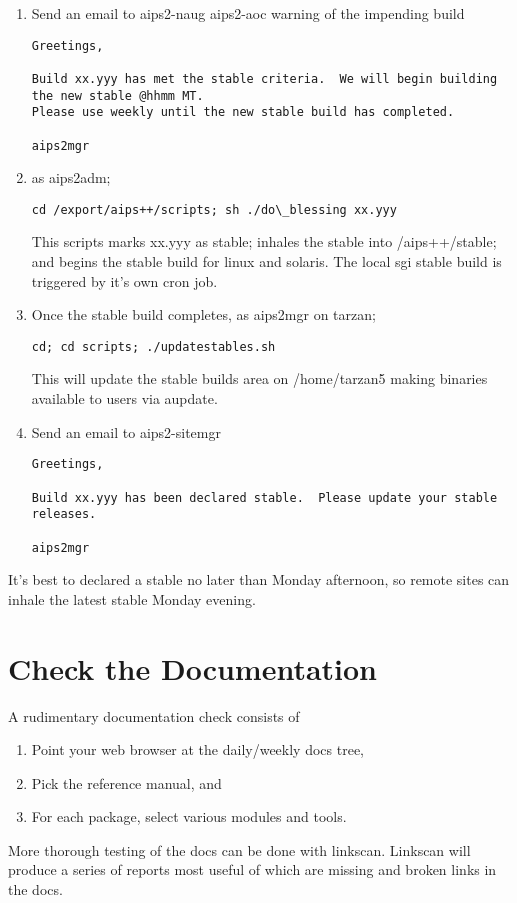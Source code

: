 \begin{enumerate}
\item Send an email to aips2-naug aips2-aoc warning of the impending build
\begin{verbatim}
Greetings,

Build xx.yyy has met the stable criteria.  We will begin building the new stable @hhmm MT.
Please use weekly until the new stable build has completed.

aips2mgr

\end{verbatim}
\item as aips2adm;
\begin{verbatim}
cd /export/aips++/scripts; sh ./do\_blessing xx.yyy
\end{verbatim}
This scripts marks xx.yyy as stable; inhales the stable into /aips++/stable; and begins the stable
build for linux and solaris.  The local sgi stable build is triggered by it's own cron job.
\item Once the stable build completes, as aips2mgr on tarzan; 
\begin{verbatim}
cd; cd scripts; ./updatestables.sh 
\end{verbatim}
This will update the stable builds area on /home/tarzan5 making binaries available to users via
aupdate.
\item Send an email to aips2-sitemgr
\begin{verbatim}
Greetings,

Build xx.yyy has been declared stable.  Please update your stable releases.

aips2mgr
\end{verbatim}
\end{enumerate}

It's best to declared a stable no later than Monday afternoon, so remote sites can
inhale the latest stable Monday evening.
\section{Check the Documentation}
A rudimentary documentation check consists of 
\begin{enumerate}
\item Point your web browser at the daily/weekly docs tree,
\item Pick the reference manual, and
\item For each package, select various modules and tools.
\end{enumerate}
More thorough testing of the docs can be done with linkscan.  Linkscan will produce a series of 
reports most useful of which are missing and broken links in the docs.
